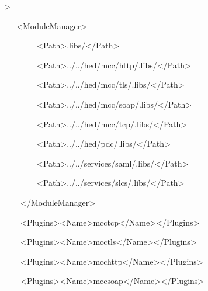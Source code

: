 \documentclass{article}
\begin{document}
{\ttfamily\color{black}
{\textgreater} }

{\ttfamily\color{black}
\ \ \ {\textless}ModuleManager{\textgreater} }

{\ttfamily\color{black}
\ \ \ \ \ \ \ \ {\textless}Path{\textgreater}.libs/{\textless}/Path{\textgreater}
}

{\ttfamily\color{black}
\ \ \ \ \ \ \ \ {\textless}Path{\textgreater}../../hed/mcc/http/.libs/{\textless}/Path{\textgreater}
}

{\ttfamily\color{black}
\ \ \ \ \ \ \ \ {\textless}Path{\textgreater}../../hed/mcc/tls/.libs/{\textless}/Path{\textgreater}
}

{\ttfamily\color{black}
\ \ \ \ \ \ \ \ {\textless}Path{\textgreater}../../hed/mcc/soap/.libs/{\textless}/Path{\textgreater}
}

{\ttfamily\color{black}
\ \ \ \ \ \ \ \ {\textless}Path{\textgreater}../../hed/mcc/tcp/.libs/{\textless}/Path{\textgreater}
}

{\ttfamily\color{black}
\ \ \ \ \ \ \ \ {\textless}Path{\textgreater}../../hed/pdc/.libs/{\textless}/Path{\textgreater}
}

{\ttfamily\color{black}
\ \ \ \ \ \ \ \ {\textless}Path{\textgreater}../../services/saml/.libs/{\textless}/Path{\textgreater}
}

{\ttfamily\color{black}
\ \ \ \ \ \ \ \ {\textless}Path{\textgreater}../../services/slcs/.libs/{\textless}/Path{\textgreater}
}

{\ttfamily\color{black}
\ \ \ \ {\textless}/ModuleManager{\textgreater} }

{\ttfamily\color{black}
\ \ \ \ {\textless}Plugins{\textgreater}{\textless}Name{\textgreater}mcctcp{\textless}/Name{\textgreater}{\textless}/Plugins{\textgreater}
}

{\ttfamily\color{black}
\ \ \ \ {\textless}Plugins{\textgreater}{\textless}Name{\textgreater}mcctls{\textless}/Name{\textgreater}{\textless}/Plugins{\textgreater}
}

{\ttfamily\color{black}
\ \ \ \ {\textless}Plugins{\textgreater}{\textless}Name{\textgreater}mcchttp{\textless}/Name{\textgreater}{\textless}/Plugins{\textgreater}
}

{\ttfamily\color{black}
\ \ \ \ {\textless}Plugins{\textgreater}{\textless}Name{\textgreater}mccsoap{\textless}/Name{\textgreater}{\textless}/Plugins{\textgreater}
}
\end{document}
